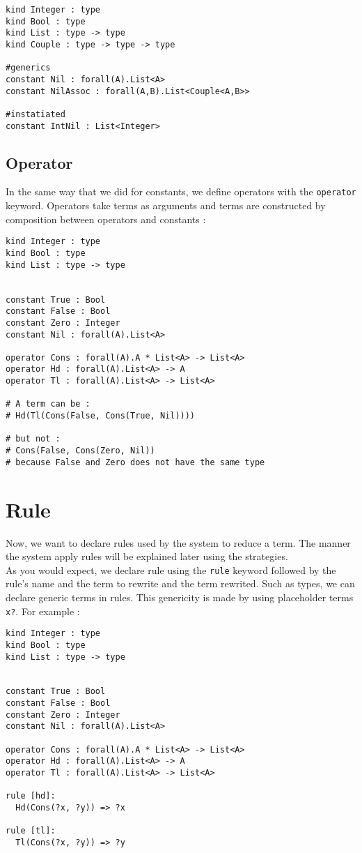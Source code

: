 \documentclass[12pt,a4paper]{article}
\begin{document}
\begin{verbatim}
kind Integer : type
kind Bool : type
kind List : type -> type
kind Couple : type -> type -> type

#generics
constant Nil : forall(A).List<A>
constant NilAssoc : forall(A,B).List<Couple<A,B>>

#instatiated
constant IntNil : List<Integer>
\end{verbatim}

\subsection{Operator}
In the same way that we did for constants, we define operators with the
\verb?operator? keyword. Operators take terms as arguments and terms
are constructed by composition between operators and constants :

\begin{verbatim}
kind Integer : type
kind Bool : type
kind List : type -> type


constant True : Bool
constant False : Bool
constant Zero : Integer
constant Nil : forall(A).List<A>

operator Cons : forall(A).A * List<A> -> List<A>
operator Hd : forall(A).List<A> -> A
operator Tl : forall(A).List<A> -> List<A>

# A term can be :
# Hd(Tl(Cons(False, Cons(True, Nil))))

# but not :
# Cons(False, Cons(Zero, Nil))
# because False and Zero does not have the same type
\end{verbatim}

\section{Rule}
Now, we want to declare rules used by the system to reduce a term.
The manner the system apply rules will be explained later using the
strategies.\\
As you would expect, we declare rule using the \verb?rule? keyword
followed by the rule's name and the term to rewrite and the term
rewrited. Such as types, we can declare generic terms in rules. This
genericity is made by using placeholder terms \verb!x?!. For example :
\begin{verbatim}
kind Integer : type
kind Bool : type
kind List : type -> type


constant True : Bool
constant False : Bool
constant Zero : Integer
constant Nil : forall(A).List<A>

operator Cons : forall(A).A * List<A> -> List<A>
operator Hd : forall(A).List<A> -> A
operator Tl : forall(A).List<A> -> List<A>

rule [hd]:
  Hd(Cons(?x, ?y)) => ?x

rule [tl]:
  Tl(Cons(?x, ?y)) => ?y
\end{verbatim}
\end{document}
